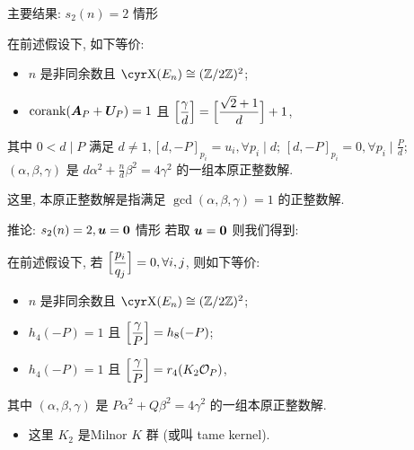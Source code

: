 \documentclass[aspectratio=169]{ctexbeamer}
\renewcommand\aleg[2]{\Bigl[\dfrac{{#1}}{#2}\Bigr]}
\begin{document}
\begin{frame}{主要结果: $s_2(n)=2$ 情形}
	\onslide<+->
	\begin{theorem}
		在前述假设下, 如下等价:
		\begin{itemize}[<*>]
			\item $n$ 是非同余数且 $\Sha(E_n)\cong(\BZ/2\BZ)^2$;
			\item $\operatorname{corank}({\boldsymbol{A}}_P+{\boldsymbol{U}}_P)=1$ 且 $\aleg{\gamma}d=\aleg{\sqrt2+1}{d}+1$,
		\end{itemize}
		其中 $0<d\mid P$ 满足 $d\ne 1, [d,-P]_{p_i}=u_i,\forall p_i\mid d$; $[d,-P]_{p_i}=0,\forall p_i\mid \frac Pd$;  $(\alpha,\beta,\gamma)$ 是 $d\alpha^2+\frac{n}d\beta^2=4\gamma^2$ 的一组本原正整数解.
	\end{theorem}
	\onslide<+->
	这里, 本原正整数解是指满足 $\gcd(\alpha,\beta,\gamma)=1$ 的正整数解.
\end{frame}


\begin{frame}{推论: $s_2(n)=2,{\boldsymbol{u}}={\bf0}$ 情形}
	\onslide<+->
	若取 ${\boldsymbol{u}}={\bf0}$ 则我们得到:
	\onslide<+->
	\begin{corollary}
		在前述假设下, 若 $\aleg{p_i}{q_j}=0, \forall i,j$, 则如下等价:
		\begin{itemize}[<*>]
			\item $n$ 是非同余数且 $\Sha(E_n)\cong(\BZ/2\BZ)^2$;
			\item $h_4(-P)=1$ 且 $\aleg{\gamma}P=h_8(-P)$;
			\item $h_4(-P)=1$ 且 $\aleg{\gamma}P=r_4(K_2\CO_P)$,
		\end{itemize}
		其中 $(\alpha,\beta,\gamma)$ 是 $P\alpha^2+Q\beta^2=4\gamma^2$ 的一组本原正整数解.
	\end{corollary}
	\begin{itemize}
		\item 这里 $K_2$ 是Milnor $K$ 群 (或叫 tame kernel).
	\end{itemize}
\end{frame}
\end{document}
